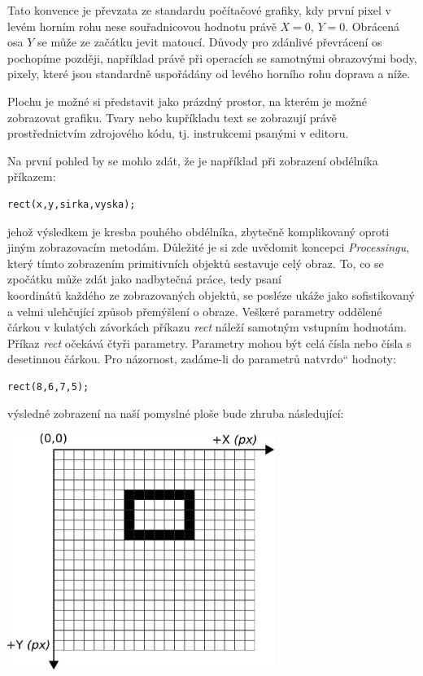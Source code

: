 \documentclass[10pt,twoside=true,open=right,cleardoublepage=empty,chapterprefix=true]{scrbook}
\renewcommand\uv[1]{\quotedblbase #1\textquotedblleft}%
\begin{document}
Tato konvence je převzata ze standardu počítačové grafiky, kdy první pixel v levém horním rohu nese souřadnicovou hodnotu právě $X = 0$, $Y = 0$. Obrácená osa $Y$ se může ze začátku jevit matoucí. Důvody pro zdánlivé převrácení os pochopíme později, například právě při operacích se samotnými obrazovými body, pixely, které jsou standardně uspořádány od levého horního rohu doprava a níže.

Plochu je možné si představit jako prázdný prostor, na kterém je možné zobrazovat grafiku. Tvary nebo kupříkladu text se zobrazují právě prostřednictvím zdrojového kódu, tj. instrukcemi psanými v editoru.

Na první pohled by se mohlo zdát, že je například při zobrazení obdélníka příkazem:

\begin{lstlisting}
rect(x,y,sirka,vyska);
\end{lstlisting}

jehož výsledkem je kresba pouhého obdélníka, zbytečně komplikovaný oproti jiným zobrazovacím metodám. Důležité je si zde uvědomit koncepci {\em Processingu}, který tímto zobrazením primitivních objektů sestavuje celý obraz. To, co se zpočátku může zdát jako nadbytečná práce, tedy psaní \\koordinátů každého ze zobrazovaných objektů, se posléze ukáže jako sofistikovaný a velmi ulehčující způsob přemýšlení o obraze. Veškeré parametry oddělené čárkou v kulatých závorkách příkazu {\em rect} náleží samotným vstupním hodnotám. Příkaz {\em rect} očekává čtyři parametry. Parametry mohou být celá čísla nebo čísla s desetinnou čárkou. Pro názornost, zadáme-li do parametrů \uv{natvrdo} hodnoty:

\begin{lstlisting}
rect(8,6,7,5);
\end{lstlisting}

výsledné zobrazení na naší pomyslné ploše bude zhruba následující:

\begin{center}
\includegraphics[width = 0.65\textwidth]{imgs/gridRect2d.png}
\end{center}
\end{document}
